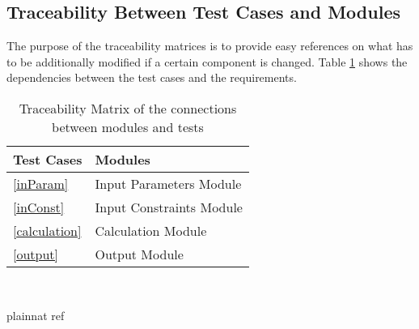 \documentclass[12pt, titlepage]{article}
\begin{document}
\subsection{Traceability Between Test Cases and Modules}
The purpose of the traceability matrices is to provide easy references on what
has to be additionally modified if a certain component is changed. Table 
\ref{Tbltrace} shows the dependencies between the test cases and the 
requirements.

\begin{table}[h!]
	\centering
	\begin{tabular}{l l} 
		\toprule		
		\textbf{Test Cases} & \textbf{Modules}\\
		\midrule 
		\ref{inParam} & Input Parameters Module\\
		\ref{inConst} & Input Constraints Module\\
		\ref{calculation} & Calculation Module\\
		\ref{output} & Output Module \\
		\bottomrule
	\end{tabular}\\

	\caption{Traceability Matrix of the connections between modules and
	tests} 
	\label{Tbltrace}
\end{table}
				
\newpage

 {plainnat}
 {ref}








\end{document}
